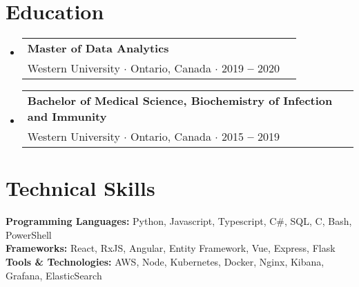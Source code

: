 \documentclass[letterpaper,10pt]{article}
\makeatletter
\newcommand{\resumeEducationHeading}[4]{
  \vspace{-2pt}\item
    \begin{tabular*}{0.97\textwidth}[t]{l@{\extracolsep{\fill}}r}
      \textbf{#1}\\
      \quad \small#3 $\cdot$ \small #4 $\cdot$ #2\\
    \end{tabular*}\vspace{-5pt}
}
\newcommand{\resumeOrganizationHeading}[4]{
  \vspace{-2pt}\item
    \begin{tabular*}{0.97\textwidth}[t]{l@{\extracolsep{\fill}}r}
      \textbf{#1} & \textit{\small #2} \\
      \textit{\small#3}
    \end{tabular*}\vspace{-7pt}
}
\newcommand{\resumeSubHeadingListStart}{\begin{itemize}[leftmargin=0.15in, label={}]}
\newcommand{\resumeSubHeadingListEnd}{\end{itemize}}
\makeatother
\begin{document}


\section{Education}
  \vspace{3pt}
  \resumeSubHeadingListStart
    
    \resumeEducationHeading
      {Master of Data Analytics}{2019 \textbf{--} 2020}
      {Western University}{Ontario, Canada}

    \resumeEducationHeading
      {Bachelor of Medical Science, Biochemistry of Infection and Immunity}{2015 \textbf{--} 2019}
      {Western University}{Ontario, Canada}

    \resumeSubHeadingListEnd



\section{Technical Skills}
  \vspace{2pt}
  \resumeSubHeadingListStart
    \small{\item{
        \textbf{Programming Languages:}{ Python, Javascript, Typescript, C\#, SQL, C, Bash, PowerShell} \\ \vspace{3pt}
        \textbf{Frameworks:}{ React, RxJS, Angular, Entity Framework, Vue, Express, Flask} \\ \vspace{3pt}
        \textbf{Tools \& Technologies:}{ AWS, Node, Kubernetes, Docker, Nginx, Kibana, Grafana, ElasticSearch} \\
    }}
  \resumeSubHeadingListEnd



    
    

\end{document}
